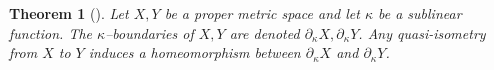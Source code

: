 \documentclass[12 pt]{amsart}
\newcommand{\calU}{\mathcal{U}}
\newcommand{\bfa}{\textbf{a}}
\newcommand{\bfb}{\textbf{b}}
\newcommand{\gothic}{\mathfrak}
\newcommand{\go}{{\gothic o}}
\newtheorem{theorem}{Theorem}[section]
\theoremstyle{definition}
\theoremstyle{remark}
\newcommand{\pka}{\partial_{\kappa}}
\newcommand{\sQ}{{\sf Q}}
\renewcommand{\bfa}{{\sf a}}
\newcommand{\mm}{{\sf m}}
\newcommand{\qq}{{\sf q}}
\newcommand{\rr}{{\sf r}}
\begin{document}

\begin{theorem} [\cite{QRT2}]
Let $X, Y$ be a proper metric space and let $\kappa$ be a sublinear function. The $\kappa$--boundaries of $X, Y$ are denoted $\pka X, \pka Y$. Any quasi-isometry from $X$ to $Y$ induces a homeomorphism between $\pka X$ and $\pka Y$.
\end{theorem}
\end{document}
